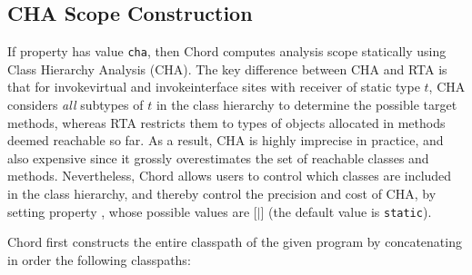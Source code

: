 
\subsection{CHA Scope Construction}

If property  has value {\tt cha}, then Chord
computes analysis scope statically using Class Hierarchy Analysis (CHA).
The key difference between CHA and RTA is that for invokevirtual and
invokeinterface sites with receiver of static type $t$, CHA considers
{\it all} subtypes of $t$ in the class hierarchy to determine the
possible target methods, whereas RTA restricts them to types of
objects allocated in methods deemed reachable so far.  As a result,
CHA is highly imprecise in practice, and also expensive since it
grossly overestimates the set of reachable classes and methods.
Nevertheless, Chord allows users to control which classes are
included in the class hierarchy, and thereby control the
precision and cost of CHA, by setting property ,
whose possible values are [$|$] (the default
value is {\tt static}).

Chord first constructs the entire classpath of the given program by
concatenating in order the following classpaths:

